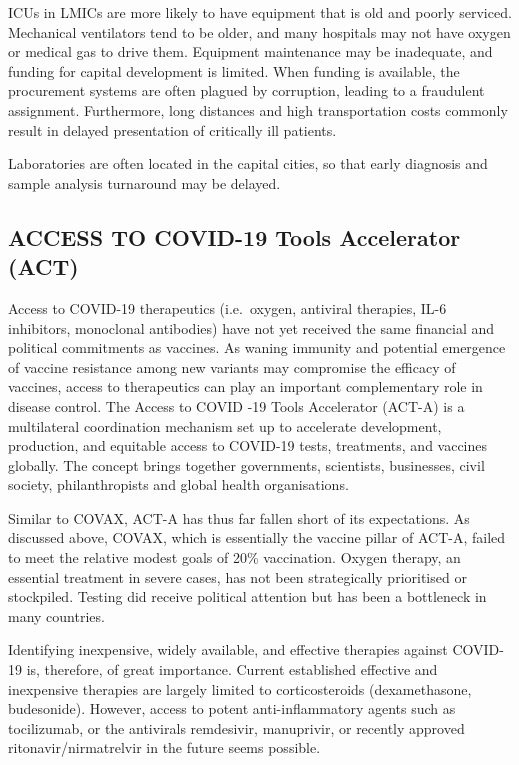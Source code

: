 \documentclass[
  11pt,
  paper=a4,
  ,captions=tableheading
]{scrartcl}
\begin{document}
ICUs in LMICs are more likely to have equipment that is old and poorly
serviced. Mechanical ventilators tend to be older, and many hospitals
may not have oxygen or medical gas to drive them. Equipment maintenance
may be inadequate, and funding for capital development is limited. When
funding is available, the procurement systems are often plagued by
corruption, leading to a fraudulent assignment. Furthermore, long
distances and high transportation costs commonly result in delayed
presentation of critically ill patients.

Laboratories are often located in the capital cities, so that early
diagnosis and sample analysis turnaround may be delayed.

\hypertarget{access-to-covid-19-tools-accelerator-act}{%
\subsection*{ACCESS TO COVID-19 Tools Accelerator
(ACT)}\label{access-to-covid-19-tools-accelerator-act}}

Access to COVID-19 therapeutics (i.e.~oxygen, antiviral therapies, IL-6
inhibitors, monoclonal antibodies) have not yet received the same
financial and political commitments as vaccines. As waning immunity and
potential emergence of vaccine resistance among new variants may
compromise the efficacy of vaccines, access to therapeutics can play an
important complementary role in disease control. The Access to COVID -19
Tools Accelerator (ACT-A) is a multilateral coordination mechanism set
up to accelerate development, production, and equitable access to
COVID-19 tests, treatments, and vaccines globally. The concept brings
together governments, scientists, businesses, civil society,
philanthropists and global health organisations.

Similar to COVAX, ACT-A has thus far fallen short of its expectations.
As discussed above, COVAX, which is essentially the vaccine pillar of
ACT-A, failed to meet the relative modest goals of 20\% vaccination.
Oxygen therapy, an essential treatment in severe cases, has not been
strategically prioritised or stockpiled. Testing did receive political
attention but has been a bottleneck in many countries.

Identifying inexpensive, widely available, and effective therapies
against COVID-19 is, therefore, of great importance. Current established
effective and inexpensive therapies are largely limited to
corticosteroids (dexamethasone, budesonide). However, access to potent
anti-inflammatory agents such as tocilizumab, or the antivirals
remdesivir, manuprivir, or recently approved ritonavir/nirmatrelvir in
the future seems possible.
\end{document}

